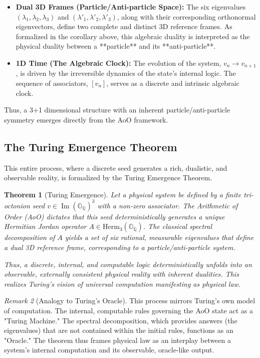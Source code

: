 \documentclass[11pt, a4paper]{article}
\newtheorem{theorem}{Theorem}[section]
\theoremstyle{definition}
\theoremstyle{remark}
\newtheorem{remark}[theorem]{Remark}
\newcommand{\OQ}{\mathbb{O}_{\mathbb{Q}}}
\begin{document}
\begin{itemize}
    \item \textbf{Dual 3D Frames (Particle/Anti-particle Space):} The six eigenvalues $(\lambda_1, \lambda_2, \lambda_3)$ and $(\lambda'_1, \lambda'_2, \lambda'_3)$, along with their corresponding orthonormal eigenvectors, define two complete and distinct 3D reference frames. As formalized in the corollary above, this algebraic duality is interpreted as the physical duality between a **particle** and its **anti-particle**.

    \item \textbf{1D Time (The Algebraic Clock):} The evolution of the system, $v_n \to v_{n+1}$, is driven by the irreversible dynamics of the state's internal logic. The sequence of associators, $[v_n]$, serves as a discrete and intrinsic algebraic clock.
\end{itemize}
Thus, a 3+1 dimensional structure with an inherent particle/anti-particle symmetry emerges directly from the AoO framework.

\subsection{The Turing Emergence Theorem}
This entire process, where a discrete seed generates a rich, dualistic, and observable reality, is formalized by the Turing Emergence Theorem.

\begin{theorem}[Turing Emergence]\label{thm:turing}
\textit{Let a physical system be defined by a finite tri-octonion seed $v \in \operatorname{Im}(\OQ)^3$ with a non-zero associator. The Arithmetic of Order (AoO) dictates that this seed deterministically generates a unique Hermitian Jordan operator $A \in \mathrm{Herm}_3(\OQ)$. The classical spectral decomposition of $A$ yields a set of six rational, measurable eigenvalues that define a dual 3D reference frame, corresponding to a particle/anti-particle system.}

\textit{Thus, a discrete, internal, and computable logic deterministically unfolds into an observable, externally consistent physical reality with inherent dualities. This realizes Turing’s vision of universal computation manifesting as physical law.}
\end{theorem}
\begin{remark}[Analogy to Turing's Oracle]
This process mirrors Turing's own model of computation. The internal, computable rules governing the AoO state act as a "Turing Machine." The spectral decomposition, which provides answers (the eigenvalues) that are not contained within the initial rules, functions as an "Oracle." The theorem thus frames physical law as an interplay between a system's internal computation and its observable, oracle-like output.
\end{remark}
\end{document}
